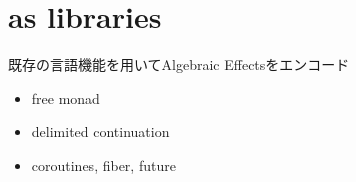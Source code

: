 \section{as libraries}
\begin{frame}
    \frametitlesec

    既存の言語機能を用いてAlgebraic Effectsをエンコード

    \begin{itemize}
        \item free monad
        \item delimited continuation
        \item \structure{$\triangle$} coroutines, fiber, future
    \end{itemize}
\end{frame}


